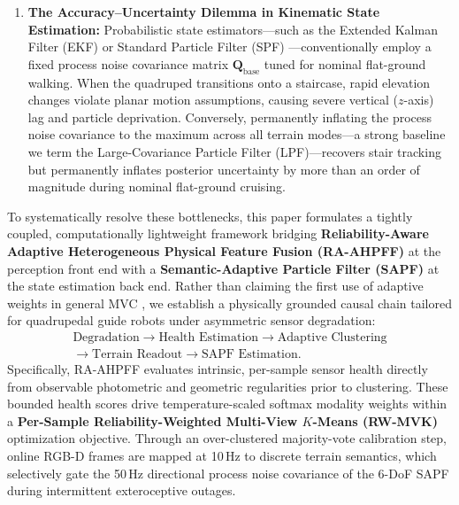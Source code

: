 \documentclass[11pt, a4paper]{article}
\begin{document}
\begin{enumerate}
    \item \textbf{The Accuracy--Uncertainty Dilemma in Kinematic State Estimation:} Probabilistic state estimators—such as the Extended Kalman Filter (EKF) or Standard Particle Filter (SPF) \cite{thrun2005probabilistic}—conventionally employ a fixed process noise covariance matrix $\mathbf{Q}_{\text{base}}$ tuned for nominal flat-ground walking. When the quadruped transitions onto a staircase, rapid elevation changes violate planar motion assumptions, causing severe vertical ($z$-axis) lag and particle deprivation. Conversely, permanently inflating the process noise covariance to the maximum across all terrain modes—a strong baseline we term the Large-Covariance Particle Filter (LPF)—recovers stair tracking but permanently inflates posterior uncertainty by more than an order of magnitude during nominal flat-ground cruising.
\end{enumerate}

To systematically resolve these bottlenecks, this paper formulates a tightly coupled, computationally lightweight framework bridging \textbf{Reliability-Aware Adaptive Heterogeneous Physical Feature Fusion (RA-AHPFF)} at the perception front end with a \textbf{Semantic-Adaptive Particle Filter (SAPF)} at the state estimation back end. Rather than claiming the first use of adaptive weights in general MVC \cite{hu2022view, yang2025deep, he2026adaptive}, we establish a physically grounded causal chain tailored for quadrupedal guide robots under asymmetric sensor degradation:
\begin{equation}
    \begin{aligned}
        \text{Degradation} \rightarrow \text{Health Estimation} \rightarrow \text{Adaptive Clustering} \\
        \rightarrow \text{Terrain Readout} \rightarrow \text{SAPF Estimation}.
    \end{aligned}
    \label{eq:causal_chain}
\end{equation}
Specifically, RA-AHPFF evaluates intrinsic, per-sample sensor health directly from observable photometric and geometric regularities prior to clustering. These bounded health scores drive temperature-scaled softmax modality weights within a \textbf{Per-Sample Reliability-Weighted Multi-View $K$-Means (RW-MVK)} optimization objective. Through an over-clustered majority-vote calibration step, online RGB-D frames are mapped at 10\,Hz to discrete terrain semantics, which selectively gate the 50\,Hz directional process noise covariance of the 6-DoF SAPF during intermittent exteroceptive outages.
\end{document}
